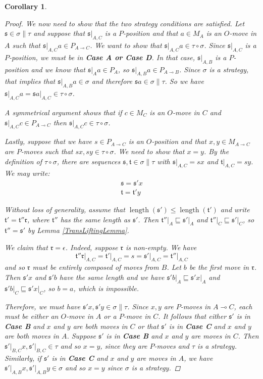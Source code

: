 \documentclass[11pt]{article} %
\theoremstyle{plain} %
\newtheorem{corollary}[theorem]{Corollary}
\theoremstyle{definition} %
\theoremstyle{note}
\theoremstyle{exercisestyle}
\renewcommand{\implies}{\multimap}
\newcommand{\comp}[2]{#1 \circ #2}
\newcommand{\s}{\mathfrak s}
\renewcommand{\t}{\mathfrak t}
\newcommand{\emptyplay}{\epsilon}
\newcommand{\prefix}{\sqsubseteq}
\DeclareMathOperator{\length}{length}
\renewcommand{\r}{\mathfrak r}
\begin{document}
\begin{corollary}
\begin{proof}
    We now need to show that the two strategy conditions are satisfied.  Let $\s\in\sigma\|\tau$ and suppose that $\s\vert_{A,C}$ is a $P$-position and that $a\in M_A$ is an $O$-move in $A$ such that $\s\vert_{A,C}a \in P_{A\implies C}$.  We want to show that $\s\vert_{A,C}a\in \comp\tau\sigma$.  Since $\s\vert_{A,C}$ is a $P$-position, we must be in \textbf{Case A or Case D}.  In that case, $\s\vert_{A,B}$ is a $P$-position and we know that $\s\vert_Aa\in P_A$, so $\s\vert_{A,B}a\in P_{A\implies B}$.  Since $\sigma$ is a strategy, that implies that $\s\vert_{A,B}a\in\sigma$ and therefore $\s a\in\sigma\|\tau$.  So we have $\s\vert_{A,C}a=\s a\vert_{A,C}\in\comp\tau\sigma$.

    A symmetrical argument shows that if $c\in M_C$ is an $O$-move in $C$ and $\s\vert_{A,C}c\in P_{A\implies C}$ then $\s\vert_{A,C}c\in\comp\tau\sigma$.  

    Lastly, suppose that we have $s\in P_{A\implies C}$ is an $O$-position and that $x,y\in M_{A\implies C}$ are $P$-moves such that $sx,sy\in\comp\tau\sigma$.  We need to show that $x=y$.  By the definition of $\comp\tau\sigma$, there are sequences $\s,\t\in\sigma\|\tau$ with $\s\vert_{A,C}=sx$ and $\t\vert_{A,C}=sy$.  We may write:
    \begin{gather*}
      \s = \s'x \\
      \t = \t'y
    \end{gather*}

    Without loss of generality, assume that $\length(\s')\le\length(\t')$ and write $\t'=\t''\r$, where $\t''$ has the same length as $\s'$.  Then $\t''\vert_A\prefix\s'\vert_A$ and $\t''\vert_C\prefix\s'\vert_C$, so $\t''=\s'$ by Lemma \ref{TransLiftingLemma}.  

    We claim that $\r=\emptyplay$.  Indeed, suppose $\r$ is non-empty.  We have
    \[
      \t''\r\vert_{A,C}=\t'\vert_{A,C}=s=\s'\vert_{A,C}=\t''\vert_{A,C}
      \]
    and so $\r$ must be entirely composed of moves from $B$.  Let $b$ be the first move in $\r$.  Then $\s'x$ and $\s'b$ have the same length and we have $\s'b\vert_A\prefix\s'x\vert_A$ and $\s'b\vert_C\prefix\s'x\vert_C$, so $b=a$, which is impossible.  

    Therefore, we must have $\s'x, \s'y\in\sigma\|\tau$.  Since $x,y$ are $P$-moves in $A\implies C$, each must be either an $O$-move in $A$ or a $P$-move in $C$.  It follows that either $\s'$ is in \textbf{Case B} and $x$ and $y$ are both moves in $C$ or that $\s'$ is in \textbf{Case C} and $x$ and $y$ are both moves in $A$.  Suppose $\s'$ is in \textbf{Case B} and $x$ and $y$ are moves in $C$.  Then $\s'\vert_{B,C}x,\s'\vert_{B,C}\in\tau$ and so $x=y$, since they are $P$-moves and $\tau$ is a strategy.  Similarly, if $\s'$ is in \textbf{Case C} and $x$ and $y$ are moves in $A$, we have $\s'\vert_{A,B}x,\s'\vert_{A,B}y\in\sigma$ and so $x=y$ since $\sigma$ is a strategy.
  \end{proof}
\end{corollary}
\end{document}
